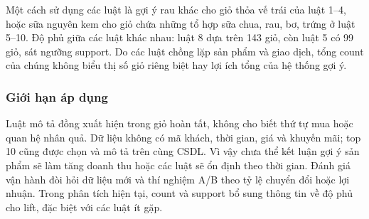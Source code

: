 Một cách sử dụng các luật là gợi ý rau khác cho giỏ thỏa vế trái của
luật 1--4, hoặc sữa nguyên kem cho giỏ chứa những tổ hợp sữa chua, rau,
bơ, trứng ở luật 5--10. Độ phủ giữa các luật khác nhau: luật 8 dựa trên
143 giỏ, còn luật 5 có 99 giỏ, sát ngưỡng support. Do các luật chồng lặp
sản phẩm và giao dịch, tổng count của chúng không biểu thị số giỏ riêng
biệt hay lợi ích tổng của hệ thống gợi ý.

\subsubsection{Giới hạn áp dụng}
Luật mô tả đồng xuất hiện trong giỏ hoàn tất, không cho biết thứ tự mua
hoặc quan hệ nhân quả. Dữ liệu không có mã khách, thời gian, giá và khuyến
mãi; top 10 cũng được chọn và mô tả trên cùng CSDL. Vì vậy chưa thể kết
luận gợi ý sản phẩm sẽ làm tăng doanh thu hoặc các luật sẽ ổn định theo thời gian.
Đánh giá vận hành đòi hỏi dữ liệu mới và thí nghiệm A/B theo tỷ lệ
chuyển đổi hoặc lợi nhuận. Trong phân tích hiện tại, count và support
bổ sung thông tin về độ phủ cho lift, đặc biệt với các luật ít gặp.
